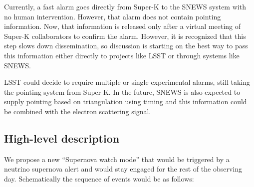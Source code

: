 \documentclass[12pt, letterpaper]{article}
\newcommand{\superk}  {Super\nobreakdash-K\xspace}
\begin{document}
Currently, a fast alarm goes directly from \superk to the SNEWS system
with no human intervention.  However, that alarm does not contain
pointing information.  Now, that information is released only after a
virtual meeting of \superk collaborators to confirm the alarm.
However, it is recognized that this step slows down dissemination, so
discussion is starting on the best way to pass this information either
directly to projects like LSST or through systems like SNEWS.

LSST could decide to require multiple or single experimental alarms,
still taking the pointing system from \superk.  In the future, SNEWS
is also expected to supply pointing based on triangulation using
timing and this information could be combined with the electron
scattering signal.

\subsection{High-level description}

We propose a new ``Supernova watch mode'' that would be triggered by a
neutrino supernova alert and would stay engaged for the rest of the
observing day.  Schematically the sequence of events would be as follows:
\end{document}

